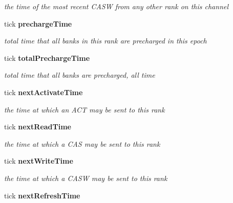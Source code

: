 \begin{CompactItemize}
\begin{CompactList}\small\item\em the time of the most recent CASW from any other rank on this channel \item\end{CompactList}\item 
tick {\bf prechargeTime}\label{class_d_r_a_msim_i_i_1_1_rank_eb77e015a3b99f650532de70c07b2d93}

\begin{CompactList}\small\item\em total time that all banks in this rank are precharged in this epoch \item\end{CompactList}\item 
tick {\bf totalPrechargeTime}\label{class_d_r_a_msim_i_i_1_1_rank_ab3ff3515ed5cfef8ed24f76ac3ea274}

\begin{CompactList}\small\item\em total time that all banks are precharged, all time \item\end{CompactList}\item 
tick {\bf nextActivateTime}\label{class_d_r_a_msim_i_i_1_1_rank_59ed61cd8b6c9e274497c437adecac49}

\begin{CompactList}\small\item\em the time at which an ACT may be sent to this rank \item\end{CompactList}\item 
tick {\bf nextReadTime}\label{class_d_r_a_msim_i_i_1_1_rank_b8293011ad2fd602dd30e43f7cca510e}

\begin{CompactList}\small\item\em the time at which a CAS may be sent to this rank \item\end{CompactList}\item 
tick {\bf nextWriteTime}\label{class_d_r_a_msim_i_i_1_1_rank_56124c95faffa161c4e37f6db65f943c}

\begin{CompactList}\small\item\em the time at which a CASW may be sent to this rank \item\end{CompactList}\item 
tick {\bf nextRefreshTime}\label{class_d_r_a_msim_i_i_1_1_rank_3a9afe5766794463fd312f978d207bcb}


\end{CompactItemize}

